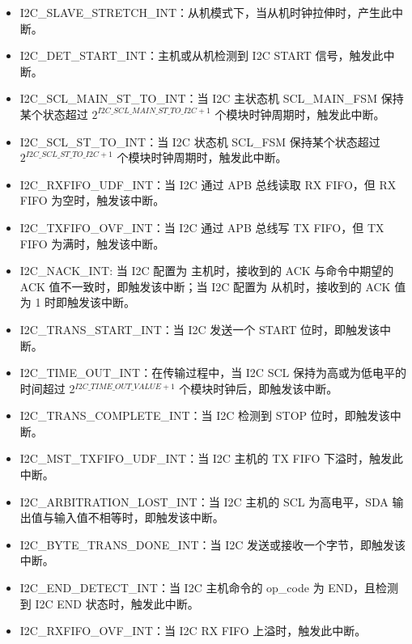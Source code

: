 \documentclass[main\_\_CN.tex]{subfiles}
\begin{document}
\begin{itemize}
\item \label{int:i2c-slave-stretch}I2C\_SLAVE\_STRETCH\_INT：从机模式下，当从机时钟拉伸时，产生此中断。
\item \label{int:i2c-start}I2C\_DET\_START\_INT：主机或从机检测到 I2C START 信号，触发此中断。
\item \label{int:i2c-scl-main-fsm}I2C\_SCL\_MAIN\_ST\_TO\_INT：当 I2C 主状态机 SCL\_MAIN\_FSM 保持某个状态超过 \(2^{\hyperref[fielddesc:I2CSCLMAINSTTOI2C]{I2C\_SCL\_MAIN\_ST\_TO\_I2C}+1}\) 个模块时钟周期时，触发此中断。
\item \label{int:i2c-scl-fsm}I2C\_SCL\_ST\_TO\_INT：当 I2C 状态机 SCL\_FSM 保持某个状态超过 \(2^{\hyperref[fielddesc:I2CSCLSTTOI2C]{I2C\_SCL\_ST\_TO\_I2C}+1}\) 个模块时钟周期时，触发此中断。
\item \label{int:i2c-rxfifo-udf}I2C\_RXFIFO\_UDF\_INT：当 I2C 通过 APB 总线读取 RX FIFO，但 RX FIFO 为空时，触发该中断。
\item \label{int:i2c-txfifo-ovf}I2C\_TXFIFO\_OVF\_INT：当 I2C 通过 APB 总线写 TX FIFO，但 TX FIFO 为满时，触发该中断。
\item \label{int:i2c-nack}I2C\_NACK\_INT: 当 I2C 配置为 主机时，接收到的 ACK 与命令中期望的 ACK 值不一致时，即触发该中断；当 I2C 配置为 从机时，接收到的 ACK 值为 1 时即触发该中断。
\item \label{int:i2c-trans-start}I2C\_TRANS\_START\_INT：当 I2C 发送一个 START 位时，即触发该中断。
\item \label{int:i2c-time-out}I2C\_TIME\_OUT\_INT：在传输过程中，当 I2C SCL 保持为高或为低电平的时间超过 2$^{\hyperref[fielddesc:I2CTIMEOUTVALUE]{I2C\_TIME\_OUT\_VALUE}+1}$ 个模块时钟后，即触发该中断。
\item \label{int:i2c-trans-complete}I2C\_TRANS\_COMPLETE\_INT：当 I2C 检测到 STOP 位时，即触发该中断。
\item \label{int:i2c-mst-txfifo-udf}I2C\_MST\_TXFIFO\_UDF\_INT：当 I2C 主机的 TX FIFO 下溢时，触发此中断。
\item \label{int:i2c-arbitration-lost}I2C\_ARBITRATION\_LOST\_INT：当 I2C 主机的 SCL 为高电平，SDA 输出值与输入值不相等时，即触发该中断。
\item \label{int:i2c-byte-trans-done}I2C\_BYTE\_TRANS\_DONE\_INT：当 I2C 发送或接收一个字节，即触发该中断。
\item \label{int:i2c-end}I2C\_END\_DETECT\_INT：当 I2C 主机命令的 op\_code 为 END，且检测到 I2C END 状态时，触发此中断。
\item \label{int:i2c-rxfifo-ovf}I2C\_RXFIFO\_OVF\_INT：当 I2C RX FIFO 上溢时，触发此中断。

\end{itemize}
\end{document}
